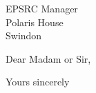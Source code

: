 \documentclass[
  fromemail,          %
  fromphone,          %
  foldmarks=false,    %
]{bristol-cs-letter}
\begin{document}

\begin{letter}{
  EPSRC Manager\\
  Polaris House\\
  Swindon
}


\opening{Dear Madam or Sir,}

\lipsum[1-5]

\closing{Yours sincerely} %



\end{letter}
\end{document}
